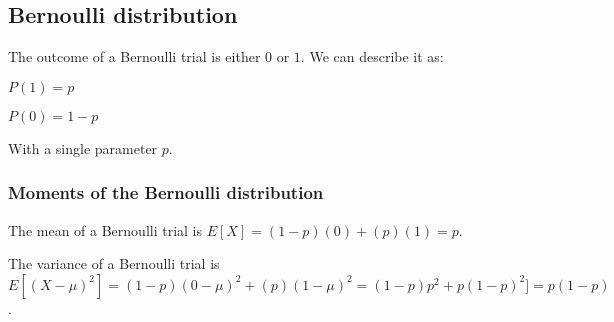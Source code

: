 
\subsection{Bernoulli distribution}

The outcome of a Bernoulli trial is either \(0\) or \(1\). We can describe it as:

\(P(1)=p\)

\(P(0)=1-p\)

With a single parameter \(p\).

\subsubsection{Moments of the Bernoulli distribution}

The mean of a Bernoulli trial is \(E[X]=(1-p)(0)+(p)(1)=p\).

The variance of a Bernoulli trial is \(E[(X-\mu)^2]=(1-p)(0-\mu)^2+(p)(1-\mu)^2=(1-p)p^2+p(1-p)^2]=p(1-p)\).

